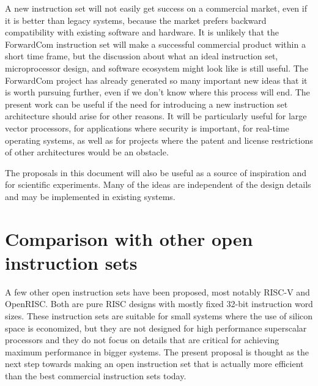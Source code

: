 \documentclass[forwardcom.tex]{subfiles}
\begin{document}
A new instruction set will not easily get success on a commercial market, even if it is better than legacy systems, because the market prefers backward compatibility with existing software and hardware. It is unlikely that the ForwardCom instruction set will make a successful commercial product within a short time frame, but the discussion about what an ideal instruction set, microprocessor design, and software ecosystem might look like is still useful. The ForwardCom project has already generated so many important new ideas that it is worth pursuing further, even if we don't know where this process will end. The present work can be useful if the need for introducing a new instruction set architecture should arise for other reasons. It will be particularly useful for large vector processors, for applications where security is important, for real-time operating systems, as well as for projects where the patent and license restrictions of other architectures would be an obstacle.
\vspace{2mm}

The proposals in this document will also be useful as a source of inspiration and for scientific experiments. Many of the ideas are independent of the design details and may be implemented in existing systems.

\section{Comparison with other open instruction sets}
A few other open instruction sets have been proposed, most notably RISC-V and OpenRISC. Both are pure RISC designs with mostly fixed 32-bit instruction word sizes. These instruction sets are suitable for small systems where the use of silicon space is economized, but they are not designed for high performance superscalar processors and they do not focus on details that are critical for achieving maximum performance in bigger systems. The present proposal is thought as the next step towards making an open instruction set that is actually more efficient than the best commercial instruction sets today.
\vspace{2mm}
\end{document}
